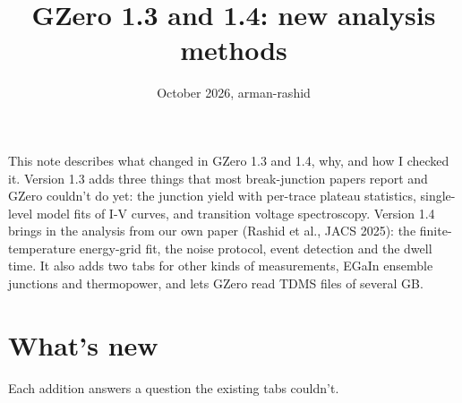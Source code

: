 \documentclass[
  11pt,
  a4paper,
]{article}
\title{GZero 1.3 and 1.4: new analysis methods}
\subtitle{October 2026, arman-rashid}
\author{}
\date{}
\begin{document}
\maketitle

This note describes what changed in GZero 1.3 and 1.4, why, and how I
checked it. Version 1.3 adds three things that most break-junction
papers report and GZero couldn't do yet: the junction yield with
per-trace plateau statistics, single-level model fits of I-V curves, and
transition voltage spectroscopy. Version 1.4 brings in the analysis from
our own paper (Rashid et al., JACS 2025): the finite-temperature
energy-grid fit, the noise protocol, event detection and the dwell time.
It also adds two tabs for other kinds of measurements, EGaIn ensemble
junctions and thermopower, and lets GZero read TDMS files of several GB.

\hypertarget{whats-new}{%
\section{What's new}\label{whats-new}}

Each addition answers a question the existing tabs couldn't.
\end{document}
